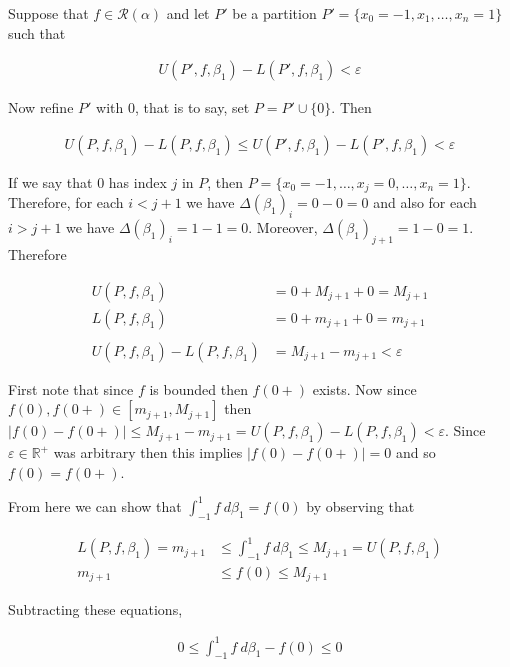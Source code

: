 \documentclass{article}
\begin{document}
  \vspace{1cm}

  Suppose that $f\in\mathscr R(\alpha)$ and let $P'$ be a partition $P'=\{x_0=-1,x_1,\dots,x_n=1\}$ such that

  \begin{align*}
    U(P',f,\beta_1)-L(P',f,\beta_1)<\varepsilon
  \end{align*}

  Now refine $P'$ with $0$, that is to say, set $P=P'\cup\{0\}$.  Then

  \begin{align*}
    U(P,f,\beta_1)-L(P,f,\beta_1)\leq U(P',f,\beta_1)-L(P',f,\beta_1)<\varepsilon
  \end{align*}

  If we say that $0$ has index $j$ in $P$, then $P=\{x_0=-1,\dots,x_j=0,\dots,x_n=1\}$.  Therefore, for each $i < j+1$ we have $\Delta(\beta_1)_i = 0-0=0$ and also for each $i>j+1$ we have $\Delta(\beta_1)_i = 1-1 = 0$.  Moreover, $\Delta(\beta_1)_{j+1}=1-0=1$.  Therefore

  \begin{align*}
    U(P,f,\beta_1)&=0+M_{j+1}+0=M_{j+1}\\
    L(P,f,\beta_1)&=0+m_{j+1}+0=m_{j+1}\\\\
    U(P,f,\beta_1)-L(P,f,\beta_1) &= M_{j+1}-m_{j+1}<\varepsilon
  \end{align*}

  First note that since $f$ is bounded then $f(0+)$ exists.  Now since $f(0),f(0+) \in [m_{j+1},M_{j+1}]$ then $|f(0)-f(0+)|\leq M_{j+1}-m_{j+1} = U(P,f,\beta_1)-L(P,f,\beta_1)< \varepsilon$.  Since $\varepsilon\in\mathbb R^+$ was arbitrary then this implies $|f(0)-f(0+)|=0$ and so $f(0)=f(0+)$.  

  \vspace{1cm}

  From here we can show that $\int_{-1}^1 f \ d\beta_1 = f(0)$ by observing that

  \begin{align*}
    L(P,f,\beta_1)=m_{j+1}&\leq \int_{-1}^1 f \ d\beta_1 \leq M_{j+1}=U(P,f,\beta_1)\\
    m_{j+1}&\leq f(0)\leq M_{j+1}
  \end{align*}

  Subtracting these equations,

  \begin{align*}
    0\leq \int_{-1}^1 f \ d\beta_1 - f(0)\leq 0
  \end{align*}
\end{document}
